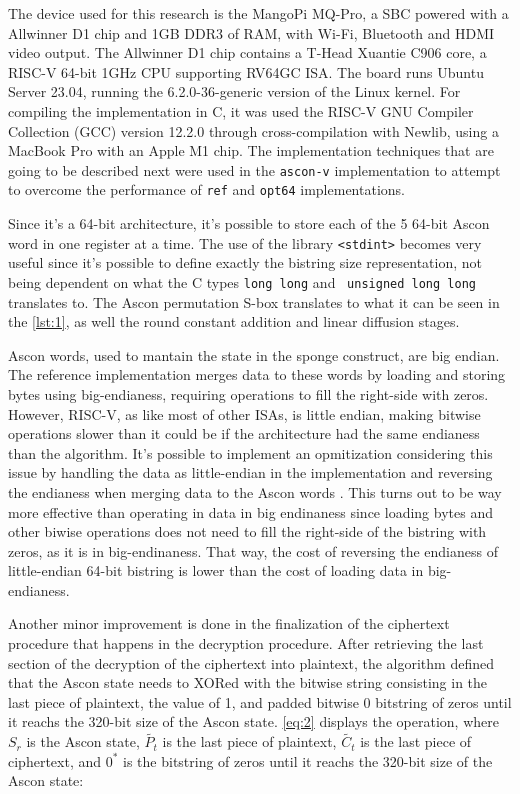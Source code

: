 \documentclass[11pt,twoside]{article}
\begin{document}
The device used for this research is the MangoPi MQ-Pro, a SBC powered with a Allwinner D1 chip and 1GB DDR3 of RAM, with Wi-Fi, Bluetooth and HDMI video output. The Allwinner D1 chip contains a T-Head Xuantie C906 core, a RISC-V 64-bit 1GHz CPU supporting RV64GC ISA. The board runs Ubuntu Server 23.04, running the 6.2.0-36-generic version of the Linux kernel. For compiling the implementation in C, it was used the RISC-V GNU Compiler Collection (GCC) version 12.2.0 \cite{riscvgnutoolchainv2023} through cross-compilation with Newlib, using a MacBook Pro with an Apple M1 chip. The implementation techniques that are going to be described next were used in the \texttt{ascon-v} implementation to attempt to overcome the performance of \texttt{ref} and \texttt{opt64} implementations.

Since it's a 64-bit architecture, it's possible to store each of the 5 64-bit Ascon word in one register at a time. The use of the library \texttt{<stdint>} becomes very useful since it's possible to define exactly the bistring size representation, not being dependent on what the C types \texttt{long long} and \
\texttt{unsigned long long} translates to. The Ascon permutation S-box translates to what it can be seen in the \cref{lst:1}, as well the round constant addition and linear diffusion stages.

Ascon words, used to mantain the state in the sponge construct, are big endian. The reference implementation merges data to these words by loading and storing bytes using big-endianess, requiring operations to fill the right-side with zeros. However, RISC-V, as like most of other ISAs, is little endian, making bitwise operations slower than it could be if the architecture had the same endianess than the algorithm. It's possible to implement an opmitization considering this issue by handling the data as little-endian in the implementation and reversing the endianess when merging data to the Ascon words \cite{jellema2019optimizing}. This turns out to be way more effective than operating in data in big endinaness since loading bytes and other biwise operations does not need to fill the right-side of the bistring with zeros, as it is in big-endinaness. That way, the cost of reversing the endianess of little-endian 64-bit bistring is lower than the cost of loading data in big-endianess.

Another minor improvement is done in the finalization of the ciphertext procedure that happens in the decryption procedure. After retrieving the last section of the decryption of the ciphertext into plaintext, the algorithm defined that the Ascon state needs to XORed with the bitwise string consisting in the last piece of plaintext, the value of 1, and padded bitwise 0 bitstring of zeros until it reachs the 320-bit size of the Ascon state. \cref{eq:2} displays the operation, where $S_r$ is the Ascon state, $\tilde{P_t}$ is the last piece of plaintext, $\tilde{C_t}$ is the last piece of ciphertext, and $0^*$ is the bitstring of zeros until it reachs the 320-bit size of the Ascon state:
\end{document}

